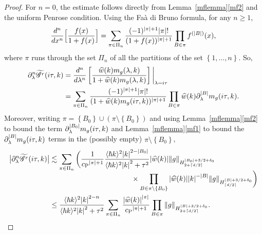\documentclass[JEP,XML,SOM,Unicode]{cedram}
\newcommand{\babs}[1]{\bigl|#1\bigr|}
\theoremstyle{plain}
\theoremstyle{remark}
\newcommand{\ak}{\abs{k}}
\newcommand{\sBbr}[1]{\Bigl[#1\Bigr]}
\newcommand{\sbr}[1]{\left[#1\right]}
\newcommand{\p}{\partial}
\newcommand{\jb}[1]{\langle#1\rangle}
\newcommand{\set}[1]{\left\{#1\right\}}
\newcommand{\lam}{\lambda}
\newcommand{\ceils}[1]{\lceil#1\rceil}
\begin{document}
\begin{proof}
For $n=0$, the estimate follows directly from Lemma~\ref{mflemma}\eqref{mf2} and the uniform Penrose condition. Using the Faà di Bruno formula, for any $n\geq 1$,
\begin{align*}
\frac{d^n}{dx^n}\sBbr{\frac{f(x)}{1+f(x)}}=\sum_{\pi\in\Pi_n}\frac{(-1)^{\abs{\pi}+1}\abs{\pi}!}{(1+f(x))^{\abs{\pi}+1}}\prod_{B\in\pi}f^{(\abs{B})}(x),
\end{align*}where $\pi$ runs through the set $\Pi_n$ of all the partitions of the set $\set{1,\ldots,n}$. So,
\begin{align*}
\p_\lam^n\widetilde {\mathscr G^r}(i\tau,k)&=\frac{d^n}{d\lam^n}\sbr{\frac{\widehat w(k)m_g(\lam,k)}{1+\widehat w(k)m_g(\lam,k)}}\bigg|_{\lam=i\tau}\\
&=\sum_{\pi\in\Pi_n}\frac{(-1)^{\abs{\pi}+1}\abs{\pi}!}{(1+\widehat w(k)m_g(i\tau,k))^{\abs{\pi}+1}}\prod_{B\in\pi}\widehat w(k)\p^{\abs{B}}_\lam m_g(i\tau,k).
\end{align*}
Moreover, writing $\pi=\set{B_0}\cup(\pi\setminus \set{B_0})$ and using Lemma~\ref{mflemma}\eqref{mf2} to bound the term $\p_\lam^{\abs{B_0}}m_g(i\tau,k)$ and Lemma~\ref{mflemma}\eqref{mf1} to bound the $\p^{\abs{B}}_\lam m_g(i\tau,k)$ terms in the (possibly empty) $\pi\setminus\set{B_0}$,
\begin{align*}
\babs{\p_\lam^n\widetilde {\mathscr G^r}(i\tau,k)}&\lesssim\sum_{\pi\in\Pi_n}\bigg(\frac{1}{{c_{\mathrm{P}}}^{\abs{\pi}+1}}\frac{\jb{\hbar k}^2\ak^{2-\abs{B_0}}}{\jb{\hbar k}^2\ak^2+\tau^2}\abs{\widehat w(k)}\norm{g}_{H^{\abs{B_0}+3/2+\delta_0}_{2+\ceils{d/2}}}\\[-5pt]
&\hspace{4cm}\times\prod_{B\in \pi\setminus\set{B_0}}\abs{\widehat w(k)}\ak^{-\abs{B}}\norm{g}_{H^{\abs{B}+3/2+\delta_0}_{\ceils{d/2}}}\bigg)\\
&\leq\frac{\jb{\hbar k}^2\ak^{2-n}}{\jb{\hbar k}^2\ak^2+\tau^2}\sum_{\pi\in \Pi_n}\frac{\abs{\widehat w(k)}^{\abs{\pi}}}{{c_{\mathrm{P}}}^{\abs{\pi}+1}}\prod_{B\in\pi}\norm{g}_{H^{\abs{B}+3/2+\delta_0}_{2+\ceils{d/2}}}.\qedhere
\end{align*}
\end{proof}
\end{document}
